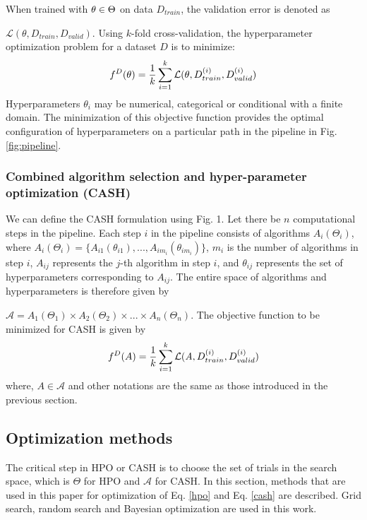 When trained with $\emph{$\theta$} \in \textbf{$\Theta$}$ on data $D_{train}$, the validation error is denoted as \par
\noindent $\mathcal{L}(\theta, D_{train}, D_{valid})$. Using $k$-fold cross-validation, the hyperparameter optimization problem for a dataset $D$ is to minimize:
\begin{equation}
\label{hpo}
f^D(\theta) = \frac{1}{k}\sum_{i=1}^{k} \mathcal{L}(\emph{$\theta$}, D_{train}^{(i)}, D_{valid}^{(i)}) 
\end{equation}
Hyperparameters $\theta_i$ may be numerical, categorical or conditional with a finite domain. The minimization of this objective function provides the optimal configuration of hyperparameters on a particular path in the pipeline in Fig. \ref{fig:pipeline}.

\subsubsection{Combined algorithm selection and hyper-parameter optimization (CASH)}
\label{subsubsec_CASH}
We can define the CASH formulation using Fig. 1. Let there be $n$ computational steps in the pipeline. Each step $i$ in the pipeline consists of algorithms $A_i(\Theta_i)$, where $A_i(\Theta_i) = \{A_{i1}(\theta_{i1}), ..., A_{im_{i}}(\theta_{im_{i}})\}$, $m_{i}$ is the number of algorithms in step $i$, $A_{ij}$ represents the $j$-th algorithm in step $i$, and \textbf{$\theta_{ij}$} represents the set of hyperparameters corresponding to  $A_{ij}$. The entire space of algorithms and hyperparameters is therefore given by \par
\noindent $\mathcal{A} = A_1(\Theta_1) \times A_2(\Theta_2) \times ... \times A_n(\Theta_n)$. The objective function to be minimized for CASH is given by
\begin{equation}
\label{cash}
f^D(A) = \frac{1}{k}\sum_{i=1}^{k} \mathcal{L}(\emph{A}, D_{train}^{(i)}, D_{valid}^{(i)}) 
\end{equation}
where, $A \in \mathcal{A}$ and other notations are the same as those introduced in the previous section.

\subsection{Optimization methods}
\label{optimization}
The critical step in HPO or CASH is to choose the set of trials in the search space, which is $\Theta$ for HPO and $\mathcal{A}$ for CASH. In this section, methods that are used in this paper for optimization of Eq. \ref{hpo} and Eq. \ref{cash} are described. Grid search, random search and Bayesian optimization are used in this work.
